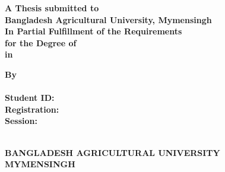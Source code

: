 \documentclass[12pt, oneside]{book}
\begin{document}
\begin{titlepage}
	\begin{center}

\begin{minipage}{\textwidth}
	\centering
		\onehalfspacing 
		\Large \textbf{\MakeUppercase{
		\ThesisTitle}}
\end{minipage}		
		
\vspace{3.0cm}

\begin{minipage}{\textwidth}
	\centering
	\large \bfseries  
	A Thesis submitted to\\ [0.2cm]
	Bangladesh Agricultural University, Mymensingh\\ [0.2cm]
	In Partial Fulfillment of the Requirements\\ [0.2cm]
	for the Degree of\\ [0.5cm]
	\Large \MyDegree{\DegreeName} in \DegreeIn 
\end{minipage}

\vspace{2cm}	


\begin{minipage}{\textwidth}
	\centering
	\large
\textbf{By} \\ [0.5cm]
	\bgroup
	\def\arraystretch{1.25}
		\textbf{\ThesisAuthor}\\ 
		\textbf{Student ID:~\StudentID}\\ 
		\textbf{Registration:~\StudentReg}\\ 
		\textbf{Session:~\StudentSession}
	\egroup
\end{minipage}		

		
\vfill
			

\begin{minipage}{\textwidth}
	\centering
		\onehalfspacing 
		\large \textbf{\MakeUppercase{ 
		\DeptName\\
		Bangladesh Agricultural University\\
		mymensingh\\ [1.5cm]
		\SubMonth~\SubYear}}
\end{minipage}	
	
\end{center}

\end{titlepage}


\end{document}
